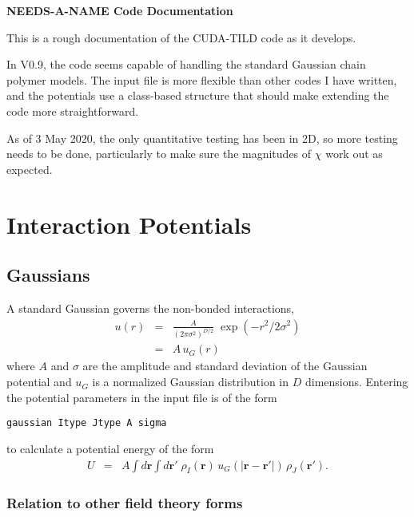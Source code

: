\documentclass[12pt]{article}
\newcommand{\mb}{\mathbf}
\begin{document}
\begin{center}
	{\bf \LARGE NEEDS-A-NAME Code Documentation}
\end{center}

This is a rough documentation of the CUDA-TILD code as it develops.

In V0.9, the code seems capable of handling the standard Gaussian chain polymer models. The input file is more flexible than other codes I have written, and the potentials use a class-based structure that should make extending the code more straightforward.

As of 3 May 2020, the only quantitative testing has been in 2D, so more testing needs to be done, particularly to make sure the magnitudes of $\chi$ work out as expected.


\section{Interaction Potentials}



\subsection{Gaussians}

A standard Gaussian governs the non-bonded interactions,
\begin{eqnarray}
u(r) &=& \frac{A}{(2\pi \sigma^2)^{D/2}} \; \exp(-r^2/2\sigma^2)
\\
&=&
A \, u_G(r)
\label{eq:gauss}
\end{eqnarray}
where $A$ and $\sigma$ are the amplitude and standard deviation of the Gaussian potential and $u_G$ is a normalized Gaussian distribution in $D$ dimensions. Entering the potential parameters in the input file is of the form
\begin{verbatim}
gaussian Itype Jtype A sigma
\end{verbatim}
to calculate a potential energy of the form
\begin{eqnarray}
U
&=&
A
\int d\mb r
\int d\mb r'
\;
\rho_I(\mb r)
\,
u_G(|\mb r - \mb r'|)
\,
\rho_J(\mb r').
\end{eqnarray}

\subsubsection{ Relation to other field theory forms}
\end{document}
